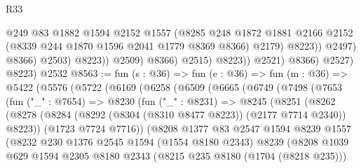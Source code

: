 \begin{lexlean}{R33}
\begin{coremodule}
                                    @249
                                    @83
                                    @1882
                                    @1594
                                    @2152
                                    @1557
                                    (@8285
                                      @248
                                      @1872
                                      @1881
                                      @2166
                                      @2152
                                      (@8339 @244 @1870 @1596 @2041 @1779 @8369 @8366)
                                      @2179)
                                    @8223))
                                @2497)
                              @8366)
                            @2503)
                          @8223))
                      @2509)
                    @8366)
                  @2515)
                @8223))
            @2521)
          @8366)
        @2527)
      @8223)
    @2532
@8563 := fun (s : @36) =>
  fun (e : @36) =>
  fun (m : @36) =>
  @5422
    (@5576
      (@5722
        (@6169
          (@6258
            (@6509
              (@6665
                (@6749
                  (@7498
                    (@7653
                      (fun ("_" : @7654) =>
                      @8230
                        (fun ("_" : @8231) =>
                        @8245
                          (@8251
                            (@8262
                              (@8278
                                (@8284
                                  (@8292 (@8304 (@8310 @8477 @8223)) (@2177 @7714 @2340))
                                  @8223))
                              (@1723 @7724 @7716))
                            (@8208
                              @1377
                              @83
                              @2547
                              @1594
                              @8239
                              @1557
                              (@8232
                                @230
                                @1376
                                @2545
                                @1594
                                (@1554 @8180 @2343)
                                @8239
                                (@8208
                                  @1039
                                  @629
                                  @1594
                                  @2305
                                  @8180
                                  @2343
                                  (@8215 @235 @8180 (@1704 (@8218 @235)))

\end{coremodule}
\end{lexlean}
